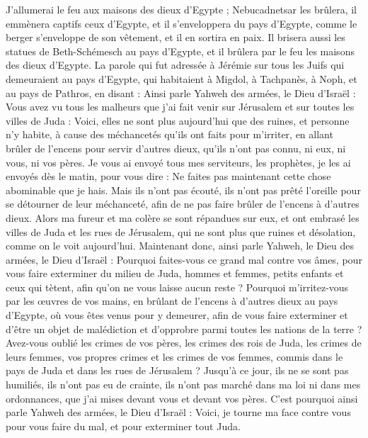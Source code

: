 \begin{multicols}{2}
J'allumerai le feu aux maisons des dieux d'Egypte ; Nebucadnetsar les brûlera, il emmènera captifs ceux d'Egypte, et il s’enveloppera du pays d'Egypte, comme le berger s'enveloppe de son vêtement, et il en sortira en paix.
Il brisera aussi les statues de Beth-Schémesch au pays d'Egypte, et il brûlera par le feu les maisons des dieux d'Egypte.
\VerseOne{}La parole qui fut adressée à Jérémie sur tous les Juifs qui demeuraient au pays d'Egypte, qui habitaient à Migdol, à Tachpanès, à Noph, et au pays de Pathros, en disant :
Ainsi parle Yahweh des armées, le Dieu d'Israël : Vous avez vu tous les malheurs que j'ai fait venir sur Jérusalem et sur toutes les villes de Juda : Voici, elles ne sont plus aujourd'hui que des ruines, et personne n'y habite,
à cause des méchancetés qu'ils ont faits pour m'irriter, en allant brûler de l’encens pour servir d'autres dieux, qu’ils n'ont pas connu, ni eux, ni vous, ni vos pères.
Je vous ai envoyé tous mes serviteurs, les prophètes, je les ai envoyés dès le matin, pour vous dire : Ne faites pas maintenant cette chose abominable que je hais.
Mais ils n'ont pas écouté, ils n'ont pas prêté l’oreille pour se détourner de leur méchanceté, afin de ne pas faire brûler de l’encens à d'autres dieux.
Alors ma fureur et ma colère se sont répandues sur eux, et ont embrasé les villes de Juda et les rues de Jérusalem, qui ne sont plus que ruines et désolation, comme on le voit aujourd'hui.
Maintenant donc, ainsi parle Yahweh, le Dieu des armées, le Dieu d'Israël : Pourquoi faites-vous ce grand mal contre vos âmes, pour vous faire exterminer du milieu de Juda, hommes et femmes, petits enfants et ceux qui tètent, afin qu'on ne vous laisse aucun reste ?
Pourquoi m'irritez-vous par les œuvres de vos mains, en brûlant de l’encens à d'autres dieux au pays d'Egypte, où vous êtes venus pour y demeurer, afin de vous faire exterminer et d’être un objet de malédiction et d’opprobre parmi toutes les nations de la terre ?
Avez-vous oublié les crimes de vos pères, les crimes des rois de Juda, les crimes de leurs femmes, vos propres crimes et les crimes de vos femmes, commis dans le pays de Juda et dans les rues de Jérusalem ?
Jusqu’à ce jour, ils ne se sont pas humiliés, ils n'ont pas eu de crainte, ils n'ont pas marché dans ma loi ni dans mes ordonnances, que j’ai mises devant vous et devant vos pères.
C'est pourquoi ainsi parle Yahweh des armées, le Dieu d'Israël : Voici, je tourne ma face contre vous pour vous faire du mal, et pour exterminer tout Juda.

\end{multicols}
